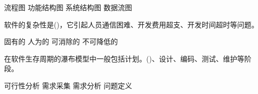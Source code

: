 \documentclass[answers]{exam}
\begin{document}
\begin{questions}
\begin{oneparchoices}
		\choice 流程图
		\choice 功能结构图
		\choice 系统结构图
		\correctchoice 数据流图
	\end{oneparchoices}
	\question 软件的复杂性是()，它引起人员通信困难、开发费用超支、开发时间超时等问题。\\
	\begin{oneparchoices}
		\correctchoice 固有的
		\choice 人为的
		\choice 可消除的
		\choice 不可降低的
	\end{oneparchoices}
	\question 在软件生存周期的瀑布模型中一般包括计划。()、设计、编码、测试、维护等阶段。\\
	\begin{oneparchoices}
		\choice 可行性分析
		\choice 需求采集
		\choice 需求分析
		\correctchoice 问题定义
	\end{oneparchoices}
\end{questions}
\clearpage
\end{document}
